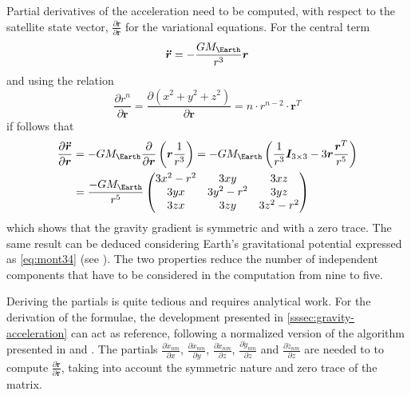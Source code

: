 Partial derivatives of the acceleration need to be computed, with respect to the 
satellite state vector, $\frac{\partial \bm{\ddot{r}}}{\partial \bm{r}}$ for the 
variational equations. For the central term
\begin{equation}
  \bm{\ddot{r}} = - \frac{GM_{\Earth}}{r^3}\bm{r}
\end{equation}
and using the relation
\begin{equation}
  \frac{\partial r^n}{\partial \bm{r}} = 
    \frac{\partial \left(x^2 + y^2 + z^2 \right)}{\partial \bm{r}} = 
      n \cdot r^{n-2} \cdot \bm{r}^T
\end{equation}
if follows that
\begin{equation}
  \begin{aligned}
    \frac{\partial \bm{\ddot{r}}}{\partial \bm{r}} &= 
    -GM_{\Earth} \frac{\partial}{\partial \bm{r}}\left( \bm{r} \frac{1}{r^3} \right) = 
    -GM_{\Earth} \left( \frac{1}{r^3}\bm{I}_{3\times 3} - 3\bm{r} \frac{\bm{r}^T}{r^5} \right) \\
    &=\frac{-GM_{\Earth}}{{r^5}} \begin{pmatrix}
      3x^2-r^2 & 3xy      & 3xz \\
      3yx      & 3y^2-r^2 & 3yz \\
      3zx      & 3zy      & 3z^2 -r^2
    \end{pmatrix}
  \end{aligned}
\end{equation}
which shows that the gravity gradient is symmetric and with a zero trace. The same result 
can be deduced considering Earth's gravitational potential expressed as \autoref{eq:mont34} 
(see \cite{Montenbruck2000}). The two properties reduce the number of independent 
components that have to be considered in the computation from nine to five. 

Deriving the partials is quite tedious and requires analytical work. For the 
derivation of the formulae, the development presented in \autoref{sssec:gravity-acceleration} 
can act as reference, following a normalized version of the algorithm presented 
in \cite{Cunningham1970} and \cite{Montenbruck2000}. The partials 
$\frac{\partial \ddot{x}_{nm}}{\partial x}$, 
$\frac{\partial \ddot{x}_{nm}}{\partial y}$, $\frac{\partial \ddot{x}_{nm}}{\partial z}$, 
$\frac{\partial \ddot{y}_{nm}}{\partial z}$ and $\frac{\partial \ddot{z}_{nm}}{\partial z}$ 
are needed to to compute $\frac{\partial \bm{\ddot{r}}}{\partial \bm{r}}$, taking 
into account the symmetric nature and zero trace of the matrix.

